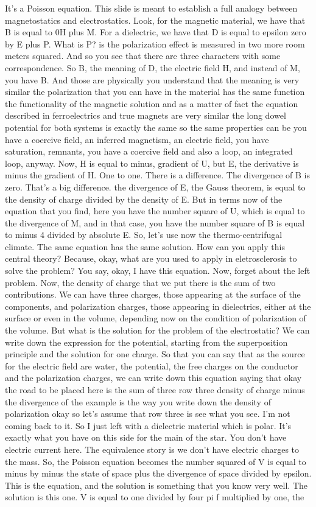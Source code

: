 It's a Poisson equation. This slide is meant to establish a full analogy between magnetostatics and electrostatics. Look, for the magnetic material, we have that B is equal to 0H plus M. For a dielectric, we have that D is equal to epsilon zero by E plus P. What is P? is the polarization effect is measured in two more room meters squared. And so you see that there are three characters with some correspondence. So B, the meaning of D, the electric field H, and instead of M, you have B. And those are physically you understand that the meaning is very similar the polarization that you can have in the material has the same function the functionality of the magnetic solution and as a matter of fact the equation described in ferroelectrics and true magnets are very similar the long dowel potential for both systems is exactly the same so the same properties can be you have a coercive field, an inferred magnetism, an electric field, you have saturation, remnants, you have a coercive field and also a loop, an integrated loop, anyway. Now, H is equal to minus, gradient of U, but E, the derivative is minus the gradient of H. One to one. There is a difference. The divergence of B is zero. That's a big difference. the divergence of E, the Gauss theorem, is equal to the density of charge divided by the density of E. But in terms now of the equation that you find, here you have the number square of U, which is equal to the divergence of M, and in that case, you have the number square of B is equal to minus 4 divided by absolute E. So, let's use now the thermo-centrifugal climate. The same equation has the same solution. How can you apply this central theory? Because, okay, what are you used to apply in eletrosclerosis to solve the problem? You say, okay, I have this equation. Now, forget about the left problem. Now, the density of charge that we put there is the sum of two contributions. We can have three charges, those appearing at the surface of the components, and polarization charges, those appearing in dielectrics, either at the surface or even in the volume, depending now on the condition of polarization of the volume. But what is the solution for the problem of the electrostatic? We can write down the expression for the potential, starting from the superposition principle and the solution for one charge. So that you can say that as the source for the electric field are water, the potential, the free charges on the conductor and the polarization charges, we can write down this equation saying that okay the road to be placed here is the sum of three row three density of charge minus the divergence of the example is the way you write down the density of polarization okay so let's assume that row three is see what you see. I'm not coming back to it. So I just left with a dielectric material which is polar. It's exactly what you have on this side for the main of the star. You don't have electric current here. The equivalence story is we don't have electric charges to the mass. So, the Poisson equation becomes the number squared of V is equal to minus by minus the state of space plus the divergence of space divided by epsilon. This is the equation, and the solution is something that you know very well. The solution is this one. V is equal to one divided by four pi f multiplied by one, the 